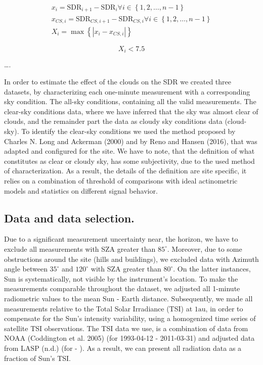 \documentclass[
  preprint, 3p, authoryear]{article}
\begin{document}
\begin{gather}
x_i = \text{SDR}_{i+1} - \text{SDR}_{i} \forall i \in \left \{ 1, 2, \ldots, n-1 \right \} \label{eq:VSM1} \\
x_{CS,i} = \text{SDR}_{CS,i+1} - \text{SDR}_{CS,i} \forall i \in \left \{ 1, 2, \ldots, n-1 \right \} \label{eq:VSM2} \\
X_i = \max{\left \{ \left | x_i - x_{CS,i} \right | \right \}} \label{eq:VSM3}
\end{gather}

\begin{equation}
X_i < 7.5
\label{eq:VSMcr}
\end{equation}

\ldots.

In order to estimate the effect of the clouds on the SDR we created three datasets, by characterizing each one-minute measurement with a corresponding sky condition.
The all-sky conditions, containing all the valid measurements.
The clear-sky conditions data, where we have inferred that the sky was almost clear of clouds, and the remainder part the data as cloudy sky conditions data (cloud-sky).
To identify the clear-sky conditions we used the method proposed by Charles N. Long and Ackerman (2000) and by Reno and Hansen (2016), that was adapted and configured for the site.
We have to note, that the definition of what constitutes as clear or cloudy sky, has some subjectivity, due to the used method of characterization.
As a result, the details of the definition are site specific, it relies on a combination of threshold of comparisons with ideal actinometric models and statistics on different signal behavior.

\hypertarget{data-and-data-selection.}{%
\subsection{Data and data selection.}\label{data-and-data-selection.}}

Due to a significant measurement uncertainty near, the horizon, we have to exclude
all measurements with SZA greater than \(85^\circ\).
Moreover, due to some obstructions around the site (hills and buildings), we excluded data with Azimuth angle between
\(35^\circ\) and \(120^\circ\) with SZA greater than \(80^\circ\).
On the latter instances, Sun is systematically, not visible by the instrument's location.
To make the measurements comparable throughout the dataset, we adjusted all 1-minute radiometric values to the mean Sun - Earth distance.
Subsequently, we made all measurements relative to the Total Solar Irradiance (TSI) at \(1 \text{au}\), in order to compensate for the Sun's intensity variability, using a homogenized time series of satellite TSI observations.
The TSI data we use, is a combination of data from NOAA (Coddington et al. 2005) (for 1993-04-12 - 2011-03-31) and adjusted data from LASP (n.d.) (for - ).
As a result, we can present all radiation data as a fraction of Sun's TSI.
\end{document}
